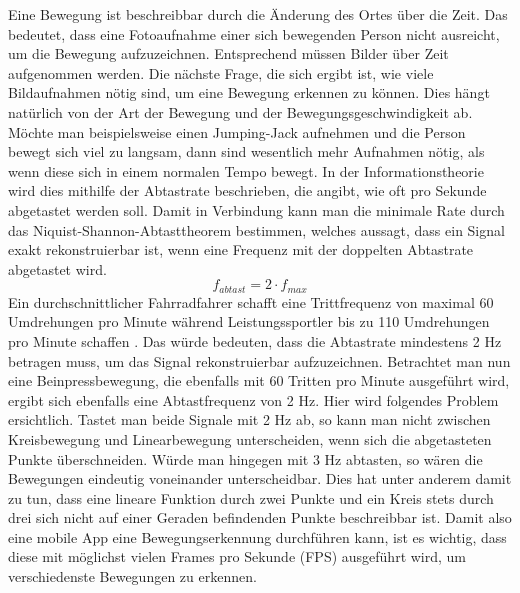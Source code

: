 Eine Bewegung ist beschreibbar durch die Änderung des Ortes über die Zeit. Das
bedeutet, dass eine Fotoaufnahme einer sich bewegenden Person nicht ausreicht,
um die Bewegung aufzuzeichnen. Entsprechend müssen Bilder über Zeit aufgenommen
werden. Die nächste Frage, die sich ergibt ist, wie viele Bildaufnahmen nötig
sind, um eine Bewegung erkennen zu können. Dies hängt natürlich von der Art der
Bewegung und der Bewegungsgeschwindigkeit ab. Möchte man beispielsweise einen
Jumping-Jack aufnehmen und die Person bewegt sich viel zu langsam, dann sind
wesentlich mehr Aufnahmen nötig, als wenn diese sich in einem normalen Tempo
bewegt. In der Informationstheorie wird dies mithilfe der Abtastrate
beschrieben, die angibt, wie oft pro Sekunde abgetastet werden soll. Damit in
Verbindung kann man die minimale Rate durch das Niquist-Shannon-Abtasttheorem
bestimmen, welches aussagt, dass ein Signal exakt rekonstruierbar ist, wenn eine
Frequenz mit der doppelten Abtastrate abgetastet wird.
\[
    f_{abtast} = 2 \cdot f_{max}
\]
Ein durchschnittlicher Fahrradfahrer schafft eine Trittfrequenz von maximal 60
Umdrehungen pro Minute während Leistungssportler bis zu 110 Umdrehungen pro
Minute schaffen \cite{smolik}. Das würde bedeuten, dass die Abtastrate
mindestens 2 Hz betragen muss, um das Signal rekonstruierbar aufzuzeichnen.
Betrachtet man nun eine Beinpressbewegung, die ebenfalls mit 60 Tritten pro
Minute ausgeführt wird, ergibt sich ebenfalls eine Abtastfrequenz von 2 Hz. Hier
wird folgendes Problem ersichtlich. Tastet man beide Signale mit 2 Hz ab, so
kann man nicht zwischen Kreisbewegung und Linearbewegung unterscheiden, wenn
sich die abgetasteten Punkte überschneiden. Würde man hingegen mit 3 Hz
abtasten, so wären die Bewegungen eindeutig voneinander unterscheidbar. Dies hat
unter anderem damit zu tun, dass eine lineare Funktion durch zwei Punkte und ein
Kreis stets durch drei sich nicht auf einer Geraden befindenden Punkte
beschreibbar ist. Damit also eine mobile App eine Bewegungserkennung durchführen
kann, ist es wichtig, dass diese mit möglichst vielen Frames pro Sekunde (FPS)
ausgeführt wird, um verschiedenste Bewegungen zu erkennen.

